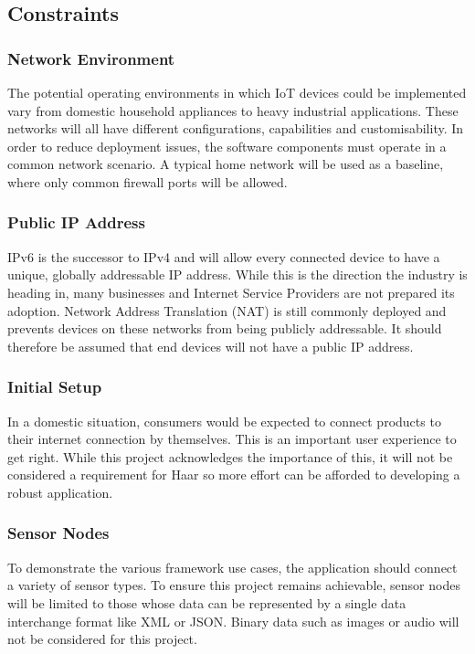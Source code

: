     \subsection{Constraints}
      \subsubsection{Network Environment}
        The potential operating environments in which IoT devices could be implemented vary from domestic household appliances to heavy industrial applications. These networks will all have different configurations, capabilities and customisability. In order to reduce deployment issues, the software components must operate in a common network scenario. A typical home network will be used as a baseline, where only common firewall ports will be allowed.

      \subsubsection{Public IP Address}
        IPv6 is the successor to IPv4 and will allow every connected device to have a unique, globally addressable IP address. While this is the direction the industry is heading in, many businesses and Internet Service Providers are not prepared its adoption. Network Address Translation (NAT) is still commonly deployed and prevents devices on these networks from being publicly addressable. It should therefore be assumed that end devices will not have a public IP address.

      \subsubsection{Initial Setup}
        In a domestic situation, consumers would be expected to connect products to their internet connection by themselves. This is an important user experience to get right. While this project acknowledges the importance of this, it will not be considered a requirement for Haar so more effort can be afforded to developing a robust application.

      \subsubsection{Sensor Nodes}
        To demonstrate the various framework use cases, the application should connect a variety of sensor types. To ensure this project remains achievable, sensor nodes will be limited to those whose data can be represented by a single data interchange format like XML or JSON. Binary data such as images or audio will not be considered for this project.

